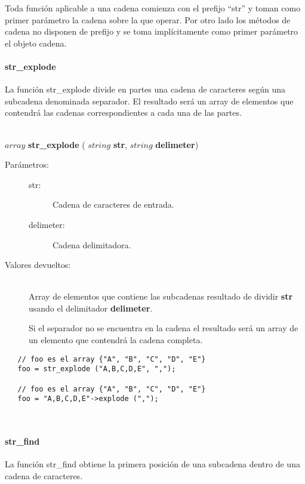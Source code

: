 Toda función aplicable a una cadena comienza con el prefijo ``str'' y toman como primer parámetro la cadena sobre la que 
operar. Por otro lado los métodos de cadena no disponen de prefijo y se toma implícitamente como primer parámetro el objeto 
cadena. 



\paragraph {str\_explode}
La función str\_explode divide en partes una cadena de caracteres según una subcadena denominada separador. El resultado 
será un array de elementos que contendrá las cadenas correspondientes a cada una de las partes. 

\hfill \\ $array$ \textbf{str\_explode} ( $string$ \textbf{str}, $string$ \textbf{delimeter})  
\begin{description}
\item [Parámetros:] \hfill 
   \begin{description}
   \item[str:] Cadena de caracteres de entrada.
   \item[delimeter:] Cadena delimitadora.
   \end{description}
\item[Valores devueltos:] \hfill \\
   Array de elementos que contiene las subcadenas resultado de dividir \textbf{str} usando el delimitador \textbf{delimeter}.
   
   Si el separador no se encuentra en la cadena el resultado será un array de un elemento que contendrá la cadena completa.
\end{description}


\begin{lstlisting}
   // foo es el array {"A", "B", "C", "D", "E"}
   foo = str_explode ("A,B,C,D,E", ","); 
   
   // foo es el array {"A", "B", "C", "D", "E"}
   foo = "A,B,C,D,E"->explode (",");
\end{lstlisting}
\hfill\\ 

\paragraph {str\_find}
La función str\_find obtiene la primera posición de una subcadena dentro de una cadena de caracteres. 

